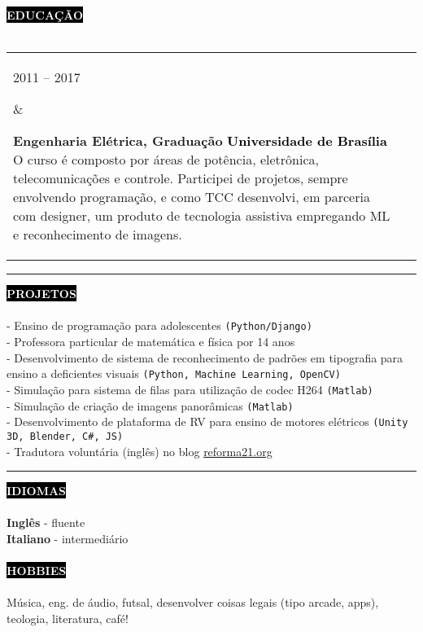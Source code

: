 \documentclass[10pt,A4]{article}
\makeatletter
\newcounter{a}
\newcounter{b}
\newcounter{c}
\newcommand{\cvsection}[1] {
	\textcolor{white}{\MakeUppercase{\textbf{#1}}}
}
\newcommand{\cvsect}[1]{
	\colorbox{black}{{\cvsection{#1}}}\\\\%
}
\newenvironment{entrylist}{%
	\begin{tabular*}{\textwidth}[t]{@{\extracolsep{\fill}}ll}
	}{%
	\end{tabular*}
}
\newcommand{\entry}[4]{%
	\parbox[t]{3.5cm}{%
		#1%
	}%
	&\parbox[t]{14cm}{%
		\textbf{#2}%
		\hfill%
		{\footnotesize \textbf{\textcolor{black}{#3}}}\\%
		#4%
	}\\\\}
\makeatother
\begin{document}
	\cvsect{Educação}
	\begin{entrylist}
		\entry
		{2011 – 2017}
		{Engenharia Elétrica, Graduação}
		{Universidade de Brasília}
		{O curso é composto por áreas de potência, eletrônica, telecomunicações e controle. Participei de projetos, sempre envolvendo programação, e como TCC desenvolvi, em parceria com designer, um produto de tecnologia assistiva empregando ML e reconhecimento de imagens.}
		\entry
		{2014 - 2015}
		{Ciência sem Fronteiras UK, Graduação Sanduíche}
		{Brunel University London}
		{O programa teve duração de 15 meses, no qual participei de curso intensivo de inglês acadêmico, projeto acadêmico de verão em processamento de vídeo (Matlab) e um ano do curso de graduação em engenharia elétrica e eletrônica, com ênfase em processamento de sinais digitais.}
	\end{entrylist}

	\begin{minipage}[t]{0.7\textwidth}\hrule height 0pt width 0pt%
		\cvsect{Projetos}
		- Ensino de programação para adolescentes \texttt{(Python/Django)}\\
		- Professora particular de matemática e física por 14 anos\\
		- Desenvolvimento de sistema de reconhecimento de padrões em tipografia para ensino a deficientes visuais \texttt{(Python, Machine Learning, OpenCV)}\\
		- Simulação para sistema de filas para utilização de codec H264 \texttt{(Matlab)}\\
		- Simulação de criação de imagens panorâmicas \texttt{(Matlab)}\\
		- Desenvolvimento de plataforma de RV para ensino de motores elétricos \texttt{(Unity 3D, Blender, C\#, JS)}\\
		- Tradutora voluntária (inglês) no blog {\href{https://reforma21.org/}{reforma21.org}}
	\end{minipage}%
	\hspace{1cm}
	\begin{minipage}[t]{0.27\textwidth}\hrule height 0pt width 0pt%
		\cvsect{Idiomas}
		\textbf{Inglês} - fluente\\
		\textbf{Italiano} - intermediário\\\\
		\cvsect{Hobbies}
		Música, eng. de áudio, futsal, desenvolver coisas legais (tipo arcade, apps), teologia, literatura, café!
	\end{minipage}%
\end{document}
